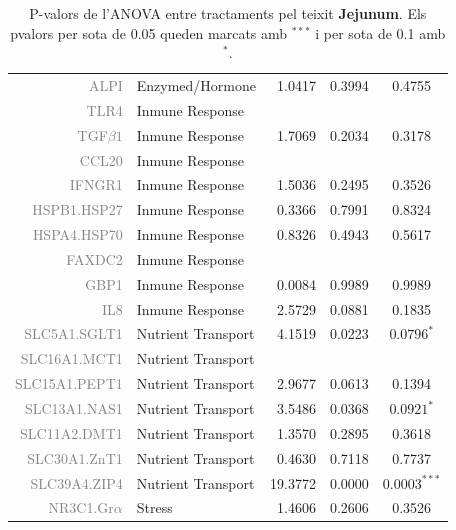 \documentclass[english]{article}
\begin{document}
\begin{table}[ht]
\begin{tabular}{rlrrc}
  {\textcolor{gray}{ALPI}} & Enzymed/Hormone & 1.0417 & 0.3994 & 0.4755 \\
  {\textcolor{gray}{TLR4}} & Inmune Response &  &  &  \\
  {\textcolor{gray}{TGF$\beta1$}} & Inmune Response & 1.7069 & 0.2034 & 0.3178 \\
  {\textcolor{gray}{CCL20}} & Inmune Response &  &  &  \\
  {\textcolor{gray}{IFNGR1}} & Inmune Response & 1.5036 & 0.2495 & 0.3526 \\
  {\textcolor{gray}{HSPB1.HSP27}} & Inmune Response & 0.3366 & 0.7991 & 0.8324 \\
  {\textcolor{gray}{HSPA4.HSP70}} & Inmune Response & 0.8326 & 0.4943 & 0.5617 \\
  {\textcolor{gray}{FAXDC2}} & Inmune Response &  &  &  \\
  {\textcolor{gray}{GBP1}} & Inmune Response & 0.0084 & 0.9989 & 0.9989 \\
  {\textcolor{gray}{IL8}} & Inmune Response & 2.5729 & 0.0881 & 0.1835 \\
  {\textcolor{gray}{SLC5A1.SGLT1}} & Nutrient Transport & 4.1519 & 0.0223 & $0.0796^{*}$  \\
  {\textcolor{gray}{SLC16A1.MCT1}} & Nutrient Transport &  &  &  \\
  {\textcolor{gray}{SLC15A1.PEPT1}} & Nutrient Transport & 2.9677 & 0.0613 & 0.1394 \\
  {\textcolor{gray}{SLC13A1.NAS1}} & Nutrient Transport & 3.5486 & 0.0368 & $0.0921^{*}$  \\
  {\textcolor{gray}{SLC11A2.DMT1}} & Nutrient Transport & 1.3570 & 0.2895 & 0.3618 \\
  {\textcolor{gray}{SLC30A1.ZnT1}} & Nutrient Transport & 0.4630 & 0.7118 & 0.7737 \\
  {\textcolor{gray}{SLC39A4.ZIP4}} & Nutrient Transport & 19.3772 & 0.0000 & $0.0003^{***}$ \\
  {\textcolor{gray}{NR3C1.Gr$\alpha$}} & Stress & 1.4606 & 0.2606 & 0.3526 \\
   \bottomrule
\end{tabular}
\caption{P-valors de l'ANOVA entre tractaments pel teixit \textbf{Jejunum}. Els pvalors per sota de 0.05 queden marcats amb $^{***}$ i per sota de 0.1 amb $^{*}$.}
\end{table}
\clearpage
\onecolumn
\end{document}
